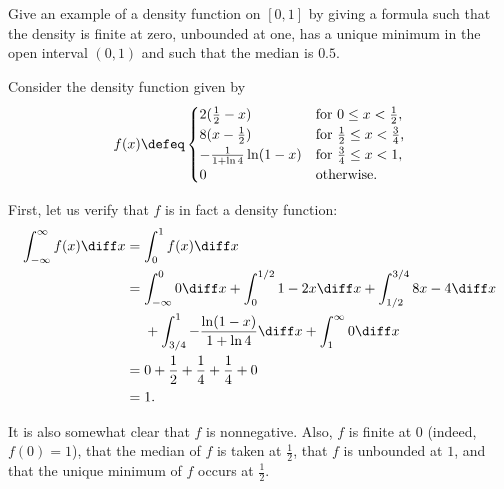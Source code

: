 \begin{problem}[Handout 12, \# 17]
  Give an example of a density function on \([0,1]\) by giving a formula
  such that the density is finite at zero, unbounded at one, has a unique
  minimum in the open interval \((0,1)\) and such that the median is
  \(0.5\).
\end{problem}
\begin{solution}
  Consider the density function given by
  \[
    f(x)\defeq
    \begin{cases}
      2(\frac{1}{2}-x) & \text{for \(0\leq x<\frac{1}{2}\)},\\
      8(x-\frac{1}{2}) & \text{for \(\frac{1}{2}\leq x<\frac{3}{4}\),}\\
      -\frac{1}{1+\ln 4}\ln(1-x) &\text{for \(\frac{3}{4}\leq x<1\)},\\
      0 & \text{otherwise.}
    \end{cases}
  \]

  First, let us verify that \(f\) is in fact a density function:
  \begin{align*}
    \int_{-\infty}^\infty f(x)\diff x
    &=\int_0^1 f(x) \diff x\\
    &=\int_{-\infty}^0 0\diff x
      +\int_0^{1/2} 1-2x\diff x%
      +\int_{1/2}^{3/4} 8x-4\diff x\\
    &\phantom{{}={}}%
      +\int_{3/4}^1-\frac{\ln(1-x)}{1+\ln 4}\diff x%
      +\int_1^\infty 0\diff x\\
    &=0+\frac{1}{2}+\frac{1}{4}+\frac{1}{4}+0\\
    &=1.
  \end{align*}

  It is also somewhat clear that $f$ is nonnegative. Also, $f$ is finite at
  $0$ (indeed, $f(0) = 1$), that the median of $f$ is taken at
  $\frac{1}{2}$, that $f$ is unbounded at $1$, and that the unique minimum
  of $f$ occurs at $\frac{1}{2}$.
\end{solution}
\newpage

